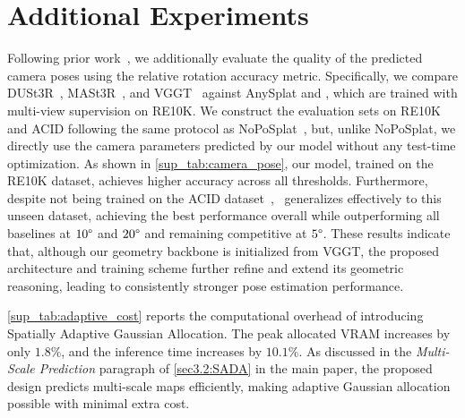 
\section{Additional Experiments}

Following prior work~\cite{sarlin2020superglue, edstedt2024roma}, 
we additionally evaluate the quality of the predicted camera poses using the relative rotation accuracy metric. Specifically, we compare DUSt3R~\cite{wang2024dust3r}, MASt3R~\cite{leroy2024mast3r}, and VGGT~\cite{wang2025vggt} against AnySplat and \OURMODEL, which are trained with multi-view supervision on RE10K.
We construct the evaluation sets on RE10K and ACID following the same protocol as NoPoSplat~\cite{ye2024nopo}, but, unlike NoPoSplat, we directly use the camera parameters predicted by our model without any test-time optimization. 
As shown in \cref{sup_tab:camera_pose}, our model, trained on the RE10K dataset, achieves higher accuracy across all thresholds. 
Furthermore, despite not being trained on the ACID dataset~\cite{liu2021acid}, \OURMODEL\, generalizes effectively to this unseen dataset, achieving the best performance overall while outperforming all baselines at $10\degree$ and $20\degree$ and remaining competitive at $5\degree$. 
These results indicate that, although our geometry backbone is initialized from VGGT, the proposed architecture and training scheme further refine and extend its geometric reasoning, leading to consistently stronger pose estimation performance.

\cref{sup_tab:adaptive_cost} reports the computational overhead of introducing Spatially Adaptive Gaussian Allocation. The peak allocated VRAM increases by only $1.8\%$, and the inference time increases by $10.1\%$. As discussed in the \textit{Multi-Scale Prediction} paragraph of \cref{sec3.2:SADA} in the main paper, the proposed design predicts multi-scale maps efficiently, making adaptive Gaussian allocation possible with minimal extra cost.
